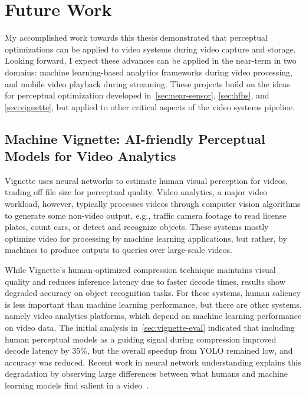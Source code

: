 \chapter{Future Work}
\label{ch:proposed}

My accomplished work towards this thesis demonstrated that perceptual optimizations can be applied to video systems during video capture and storage.
Looking forward, I expect these advances can be applied in the near-term in two domains: machine learning-based analytics frameworks during video processing, and mobile video playback during streaming.
These projects build on the ideas for perceptual optimization developed in~\ref{sec:near-sensor}, \ref{sec:hfbs}, and \ref{sec:vignette}, but applied to other critical aspects of the video systems pipeline.



\section{Machine Vignette: AI-friendly Perceptual Models for Video Analytics}
\label{sec:mach-vign}
Vignette uses neural networks to estimate human visual perception for videos, trading off file size for perceptual quality.
Video analytics, a major video workload, however, typically processes videos through computer vision algorithms to generate some non-video output, e.g., traffic camera footage to read license plates, count cars, or detect and recognize objects.
These systems mostly optimize video for processing by machine learning applications, but rather, by machines to produce outputs to queries over large-scale videos.

While Vignette's human-optimized compression technique maintains visual quality and reduces inference latency due to faster decode times, results show degraded accuracy on object recognition tasks.
For these systems, human saliency is less important than machine learning performance, but there are other systems, namely video analytics platforms, which depend on machine learning performance on video data.
The initial analysis in~\ref{sec:vignette-eval} indicated that including human perceptual models as a guiding signal during compression improved decode latency by 35\%, but the overall speedup from YOLO remained low, and accuracy was reduced.
Recent work in neural network understanding explains this degradation by observing large differences between what humans and machine learning models find salient in a video~\cite{olah2018the}.

